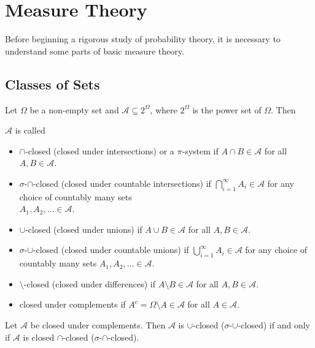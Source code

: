 \section{Measure Theory}

Before beginning a rigorous study of probability theory, it is necessary to understand some parts of basic measure theory.

\subsection{Classes of Sets}

\vspace{2mm}
Let $\Omega$ be a non-empty set and $\mathcal{A}\subseteq2^\Omega$, where $2^\Omega$ is the power set of $\Omega$. Then

\begin{definition}
    $\mathcal{A}$ is called
    \begin{itemize}
        \item $\cap$-closed (closed under intersections) or a $\pi$-system if $A\cap B\in \mathcal{A}$ for all $A,B\in\mathcal{A}$.
        \item $\sigma$-$\cap$-closed (closed under countable intersections) if $\bigcap_{i=1}^\infty A_i\in\mathcal{A}$ for any choice of countably many sets\\ $A_1, A_2, \ldots\in\mathcal{A}$.
        \item $\cup$-closed (closed under unions) if $A\cup B\in \mathcal{A}$ for all $A,B\in\mathcal{A}$.
        \item $\sigma$-$\cup$-closed (closed under countable unions) if $\bigcup_{i=1}^\infty A_i\in\mathcal{A}$ for any choice of countably many sets $A_1, A_2, \ldots\in\mathcal{A}$.
        \item $\setminus$-closed (closed under differences) if $A\setminus B\in\mathcal{A}$ for all $A,B\in\mathcal{A}$.
        \item closed under complements if $A^c=\Omega\setminus A\in\mathcal{A}$ for all $A\in\mathcal{A}$.
    \end{itemize}
\end{definition}

\begin{theorem}
\label{cupclosediffcapclosed}
    Let $\mathcal{A}$ be closed under complements. Then $\mathcal{A}$ is $\cup$-closed ($\sigma$-$\cup$-closed) if and only if $\mathcal{A}$ is closed $\cap$-closed ($\sigma$-$\cap$-closed).
\end{theorem}

